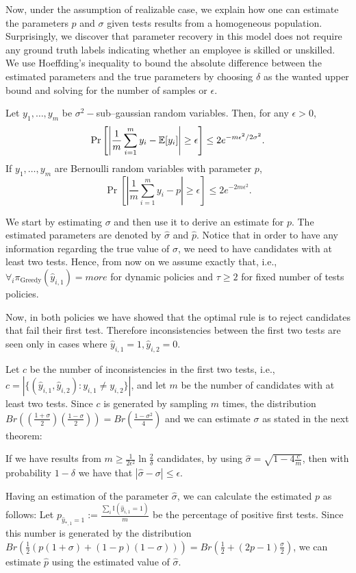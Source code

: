 

Now, under the assumption of realizable case, 
we explain how one can estimate the parameters $p$ and $\sigma$
given tests results from a homogeneous population.
Surprisingly, we discover that parameter recovery
in this model does not require any ground truth labels
indicating whether an employee is skilled or unskilled.
% 
%
We use Hoeffding’s inequality to bound the absolute difference 
between the estimated parameters and the true parameters 
by choosing $\delta$ as the wanted upper bound 
and solving for the number of samples or $\epsilon$.
\begin{lemma}%
Let $y_1,\dots,y_m$ be $\sigma^2-$sub--gaussian random variables. 
Then, for any $\epsilon>0$,
\[
\Pr\left[\left|\frac{1}{m}\sum_{i=1}^m y_i-\mathbb{E}[y_i]\right|\geq \epsilon\right]\leq 2e^{-m\epsilon^2/2\sigma^2}.
\]
If $y_1,\dots,y_m$ are Bernoulli random variables with parameter $p$,
\[
\Pr\left[\left|\frac{1}{m}\sum_{i=1}^m y_i-p\right|\geq \epsilon\right]\leq 2e^{-2m\epsilon^2}.
\]
\end{lemma}
%
We start by estimating $\sigma$ and then use it to derive an estimate for $p$. 
The estimated parameters are denoted by $\hat{\sigma}$ and $\hat{p}$.
Notice that in order to have any information regarding the true value of $\sigma$, 
we need to have candidates with at least two tests. 
Hence, from now on we assume exactly that, i.e., 
$\forall_i \pi_{\text{Greedy}}(\hat{y}_{i,1})=more$ for dynamic policies 
and $\tau\geq2$ for fixed number of tests policies. 

Now, in both policies we have showed that the optimal rule 
is to reject candidates that fail their first test. 
Therefore inconsistencies between the first two tests 
are seen only in cases where $\hat{y}_{i,1}=1,\hat{y}_{i,2}=0$.

Let $c$ be the number of inconsistencies in the first two tests, 
i.e., $c=|\{(\hat{y}_{i,1},\hat{y}_{i,2}):y_{i,1}\ne y_{i,2}\}|$, 
and let $m$ be the number of candidates with at least two tests. 
Since $c$ is generated by sampling $m$ times,
the distribution $Br((\frac{1+\sigma}{2})(\frac{1-\sigma}{2}))=Br(\frac{1-\sigma^2}{4})$ and we can estimate $\sigma$ as stated in the next theorem:
\begin{theorem}
If we have results from $m\geq \frac{1}{2\epsilon^2} \ln \frac{2}{\delta}$ candidates, 
by using $\hat{\sigma}=\sqrt{1-4\frac{c}{m}}$,
then with probability $1-\delta$ we have that $|\hat{\sigma}-\sigma|\leq \epsilon$.
\end{theorem}
Having an estimation of the parameter $\hat{\sigma}$, 
we can calculate the estimated $p$ as follows:
%
Let $p_{\hat{y}_{*,1}=1}:=\frac{\sum_i\mathbb{I}(\hat{y}_{i,1}=1)}{m}$ be 
the percentage of positive first tests. 
%
Since this number is generated by the distribution $Br(\frac{1}{2}(p(1+\sigma)+(1-p)(1-\sigma)))=Br(\frac{1}{2}+(2p-1)\frac{\sigma}{2})$, 
we can estimate $\hat{p}$ using the estimated value of $\hat{\sigma}$.

